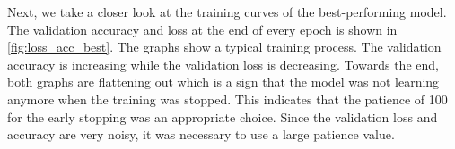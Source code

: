 

Next, we take a closer look at the training curves of the best-performing model. The validation accuracy and loss at the end of
every epoch is shown in \autoref{fig:loss_acc_best}. The graphs show a typical
training process. The validation accuracy is increasing while the validation loss
is decreasing. Towards the end, both graphs are flattening out which is a sign that
the model was not learning anymore when the training was stopped. This indicates that the patience
of 100 for the early stopping was an appropriate choice. Since the validation loss
and accuracy are very noisy, it was necessary to use a large patience value.


